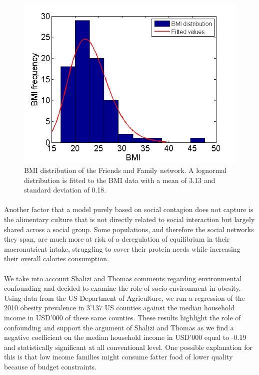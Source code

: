 \documentclass[11pt]{article}
\begin{document}
\begin{figure}[!ht]
\center
   \includegraphics[scale = 0.9]{bmi_distribution_figure4.png}
   \caption{\label{4} BMI distribution of the Friends and Family network. A lognormal distribution is fitted to the BMI data with a mean of 3.13 and standard deviation of 0.18.}
\end{figure}


\paragraph{}

Another factor that a model purely based on social contagion does not capture is the alimentary culture that is not directly related to social interaction but largely shared across a social group. Some populations, and therefore the social networks they span, are much more at risk of a deregulation of equilibrium in their macronutrient intake, struggling to cover their protein needs while increasing their overall calories consumption. 

\paragraph{}
We take into account Shalizi and Thomas comments regarding environmental confounding and decided to examine the role of socio-environment in obesity. Using data from the US Department of Agriculture, we run a regression of the 2010 obesity prevalence in 3'137 US counties against the median household income in USD'000 of these same counties. These results highlight the role of confounding and support the argument of Shalizi and Thomas as we find a negative coefficient on the median household income in USD'000 equal to -0.19 and statistically significant at all conventional level. One possible explanation for this is that low income families might consume fatter food of lower quality because of budget constraints.
\end{document}
